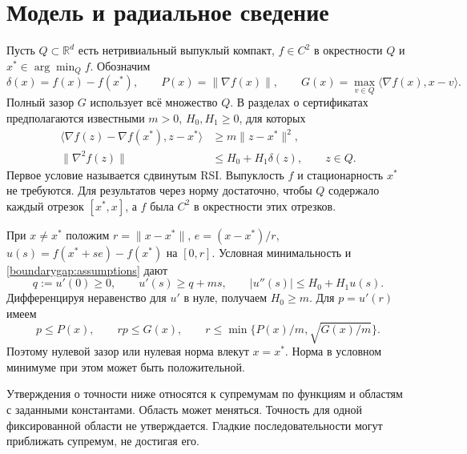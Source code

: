 \section{Модель и радиальное сведение}
\label{compact:assumptions}\label{sec:model}
Пусть $Q\subset\mathbb R^d$ есть нетривиальный выпуклый компакт,
$f\in C^2$ в окрестности $Q$ и $x^*\in\arg\min_Q f$.
Обозначим
\begin{equation}\label{eq:gap}
 \delta(x)=f(x)-f(x^*),\qquad P(x)=\|\nabla f(x)\|,
 \qquad G(x)=\max_{v\in Q}\langle\nabla f(x),x-v\rangle.
\end{equation}
Полный зазор $G$ использует всё множество $Q$.
В разделах о сертификатах предполагаются известными
$m>0$, $H_0,H_1\ge0$, для которых
\begin{equation}\label{boundarygap:assumptions}
 \begin{aligned}
 \langle\nabla f(z)-\nabla f(x^*),z-x^*\rangle
   &\ge m\|z-x^*\|^2,\\
 \|\nabla^2 f(z)\|&\le H_0+H_1\delta(z),\qquad z\in Q.
 \end{aligned}
\end{equation}
Первое условие называется сдвинутым RSI. Выпуклость $f$ и
стационарность $x^*$ не требуются. Для результатов через норму
достаточно, чтобы $Q$ содержало каждый отрезок $[x^*,x]$, а
$f$ была $C^2$ в окрестности этих отрезков.

При $x\ne x^*$ положим $r=\|x-x^*\|$, $e=(x-x^*)/r$,
$u(s)=f(x^*+se)-f(x^*)$ на $[0,r]$. Условная минимальность и
\eqref{boundarygap:assumptions} дают
\begin{equation}\label{compact:radial-data}
 q:=u'(0)\ge0,\qquad u'(s)\ge q+ms,
 \qquad |u''(s)|\le H_0+H_1u(s).
\end{equation}
Дифференцируя неравенство для $u'$ в нуле, получаем $H_0\ge m$.
Для $p=u'(r)$ имеем
\begin{equation}\label{compact:observed-caps}
 p\le P(x),\qquad rp\le G(x),\qquad
 r\le\min\{P(x)/m,\sqrt{G(x)/m}\}.
\end{equation}
Поэтому нулевой зазор или нулевая норма влекут $x=x^*$.
Норма в условном минимуме при этом может быть положительной.

Утверждения о точности ниже относятся к супремумам по функциям
и областям с заданными константами. Область может меняться.
Точность для одной фиксированной области не утверждается.
Гладкие последовательности могут приближать супремум, не достигая его.
